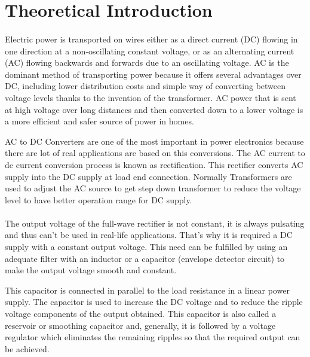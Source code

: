 \section{Theoretical Introduction}
\label{sec:theoretical}

\paragraph{}
Electric power is transported on wires either as a direct current (DC) flowing in one direction at a non-oscillating constant voltage, or as an alternating current (AC) flowing backwards and forwards due to an oscillating voltage. AC is the dominant method of transporting power because it offers several advantages over DC, including lower distribution costs and simple way of converting between voltage levels thanks to the invention of the transformer. AC power that is sent at high voltage over long distances and then converted down to a lower voltage is a more efficient and safer source of power in homes. 

AC to DC Converters are one of the most important in power electronics because there are lot of real applications are based on this conversions. The AC current to dc current conversion process is known as rectification. This rectifier converts AC supply into the DC supply at load end connection. Normally Transformers are used to adjust the AC source to get step down transformer to reduce the voltage level to have better operation range for DC supply.

\paragraph{}
The output voltage of the full-wave rectifier is not constant, it is always pulsating and thus can’t be used in real-life applications. That's why it is required a DC supply with a constant output voltage. This need can be fulfilled by using an adequate filter with an inductor or a capacitor (envelope detector circuit) to make the output voltage smooth and constant.

This capacitor is connected in parallel to the load resistance in a linear power supply. The capacitor is used to increase the DC voltage and to reduce the ripple voltage components of the output obtained. This capacitor is also called a reservoir or smoothing capacitor and, generally, it is followed by a voltage regulator which eliminates the remaining ripples so that the required output can be achieved.


